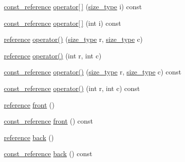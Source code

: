 \begin{DoxyCompactItemize}
\item 
\hyperlink{classtrimesh_1_1XForm_a33bd450d8902f70aaf7d4bf9fec01502}{const\+\_\+reference} \hyperlink{classtrimesh_1_1XForm_aea70c903539f3d6411a5195bee088f7a}{operator\mbox{[}$\,$\mbox{]}} (\hyperlink{classtrimesh_1_1XForm_aa219f141417c9026a74dec8b6279d4bf}{size\+\_\+type} i) const
\item 
\hyperlink{classtrimesh_1_1XForm_a33bd450d8902f70aaf7d4bf9fec01502}{const\+\_\+reference} \hyperlink{classtrimesh_1_1XForm_a2acbff85e341435ee5783659d97e3975}{operator\mbox{[}$\,$\mbox{]}} (int i) const
\item 
\hyperlink{classtrimesh_1_1XForm_afef5285ff7d9ea2e25a4bb4d966bd674}{reference} \hyperlink{classtrimesh_1_1XForm_af28494574b8e85fce45971e16d85f9fa}{operator()} (\hyperlink{classtrimesh_1_1XForm_aa219f141417c9026a74dec8b6279d4bf}{size\+\_\+type} r, \hyperlink{classtrimesh_1_1XForm_aa219f141417c9026a74dec8b6279d4bf}{size\+\_\+type} c)
\item 
\hyperlink{classtrimesh_1_1XForm_afef5285ff7d9ea2e25a4bb4d966bd674}{reference} \hyperlink{classtrimesh_1_1XForm_a20cdf49d77caf2401ca4707491db0f15}{operator()} (int r, int c)
\item 
\hyperlink{classtrimesh_1_1XForm_a33bd450d8902f70aaf7d4bf9fec01502}{const\+\_\+reference} \hyperlink{classtrimesh_1_1XForm_afe061d1d4d3d2c399ffb0648bc16f059}{operator()} (\hyperlink{classtrimesh_1_1XForm_aa219f141417c9026a74dec8b6279d4bf}{size\+\_\+type} r, \hyperlink{classtrimesh_1_1XForm_aa219f141417c9026a74dec8b6279d4bf}{size\+\_\+type} c) const
\item 
\hyperlink{classtrimesh_1_1XForm_a33bd450d8902f70aaf7d4bf9fec01502}{const\+\_\+reference} \hyperlink{classtrimesh_1_1XForm_a7f3b2e8fecc39c0d28b965802892d4bd}{operator()} (int r, int c) const
\item 
\hyperlink{classtrimesh_1_1XForm_afef5285ff7d9ea2e25a4bb4d966bd674}{reference} \hyperlink{classtrimesh_1_1XForm_af90a50637f3aa3dfc2a089cfb389ad8d}{front} ()
\item 
\hyperlink{classtrimesh_1_1XForm_a33bd450d8902f70aaf7d4bf9fec01502}{const\+\_\+reference} \hyperlink{classtrimesh_1_1XForm_a804eb68232a117ad43bfd0257a7dda82}{front} () const
\item 
\hyperlink{classtrimesh_1_1XForm_afef5285ff7d9ea2e25a4bb4d966bd674}{reference} \hyperlink{classtrimesh_1_1XForm_a2ed0156ff25334374691176aeb1fe6d5}{back} ()
\item 
\hyperlink{classtrimesh_1_1XForm_a33bd450d8902f70aaf7d4bf9fec01502}{const\+\_\+reference} \hyperlink{classtrimesh_1_1XForm_aa2b191381274a21eaf1a835f36f0043f}{back} () const

\end{DoxyCompactItemize}

